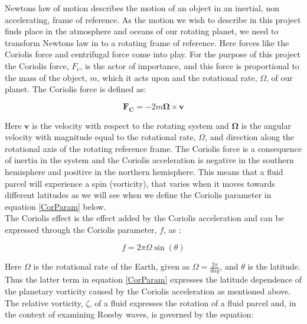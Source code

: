 \documentclass[12pt]{article}
\numberwithin{figure}{section}
\numberwithin{table}{section}
\begin{document}
\noindent Newtons law of motion describes the motion of an object in an inertial, non accelerating, frame of reference. As the motion we wish to describe in this project finds place in the atmosphere and oceans of our rotating planet, we need to transform Newtons law in to a rotating frame of reference. Here forces like the Coriolis force and centrifugal force come into play. For the purpose of this project the Coriolis force, $F_c$, is the actor of importance, and this force is proportional to the mass of the object, $m$, which it acts upon and the rotational rate, $\Omega$, of our planet. The Coriolis force is defined as:

\begin{equation}
		\mathbf{F_C} = - 2 m \mathbf{\Omega} \times  \mathbf{v} 
\end{equation}

\noindent Here $\mathbf{v}$ is the velocity with respect to the rotating system and $\mathbf{\Omega}$  is the angular velocity with magnitude equal to the rotational rate, $\Omega$, and direction along the rotational axis of the rotating reference frame. The Coriolis force is a consequence of inertia in the system and the Coriolis acceleration is negative in the southern hemisphere and positive in the northern hemisphere. This means that a fluid parcel will experience a spin (vorticity), that varies when it moves towards different latitudes as we will see when we define the Coriolis parameter in equation \eqref{CorParam} below.   \\


\noindent The Coriolis effect is the effect added by the Coriolis acceleration and can be expressed through the Coriolis parameter, $f$, as \cite{pro5}:

\begin{equation}
		f = 2 \pi \Omega \sin(\theta)
        \label{CorParam}
\end{equation}

\noindent Here $\Omega$ is the rotational rate of the Earth, given as $\Omega = \frac{2\pi}{day}$, and $\theta$ is the latitude. Thus the latter term in equation \eqref{CorParam} expresses the latitude dependence of the planetary vorticity caused by the Coriolis acceleration as mentioned above. \\

\noindent The relative vorticity, $\zeta$, of a fluid expresses the rotation of a fluid parcel and, in the context of examining Rossby waves, is governed by the equation:
\end{document}
